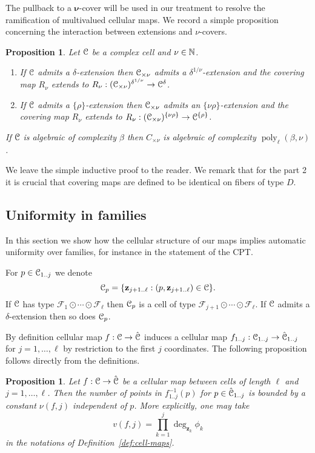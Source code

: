 \documentclass[reqno]{amsart}
\newtheorem{Prop}[Cor]{Proposition}{\bfseries}{\itshape}
\renewcommand\~[1]{\widetilde{#1}}
\def\poly{\operatorname{poly}} \def\J{\operatorname{J}}
\def\cF{{\mathcal F}} \def\cL{{\mathcal L}} \def\cR{{\mathcal R}}
\def\vz{{\mathbf z}}
\def\vnu{{\boldsymbol\nu}}
\def\he#1{{\{#1\}}}
\def\hrho{{\he\rho}}
\begin{document}
The pullback to a $\vnu$-cover will be used in our treatment to
resolve the ramification of multivalued cellular maps. We record a
simple proposition concerning the interaction between extensions and
$\nu$-covers. 

\begin{Prop}\label{prop:ext-v-cover}
  Let ${\mathcal C}$ be a complex cell and $\nu\in{\mathbb N}$.
  \begin{enumerate}
  \item If ${\mathcal C}$ admits a $\delta$-extension then ${\mathcal C}_{\times\nu}$
    admits a $\delta^{1/\nu}$-extension and the covering map $R_\nu$
    extends to
    $R_\nu:({\mathcal C}_{\times\nu})^{\delta^{1/\nu}}\to{\mathcal C}^\delta$.
  \item If ${\mathcal C}$ admits a $\hrho$-extension then ${\mathcal C}_{\times\nu}$
    admits an $\he{\nu\rho}$-extension and the covering map $R_\nu$
    extends to $R_\nu:(\cC_{\times\nu})^{\he{\nu\rho}}\to\cC^\hrho$.
  \end{enumerate}
  If ${\mathcal C}$ is algebraic of complexity $\beta$ then $C_{\times\nu}$ is
  algebraic of complexity $\poly_\ell(\beta,\nu)$.
\end{Prop}

We leave the simple inductive proof to the reader. We remark that for
the part 2 it is crucial that covering maps are defined to be
identical on fibers of type $D$.

\subsection{Uniformity in families}
\label{sec:uniform-families}

In this section we show how the cellular structure of our maps implies
automatic uniformity over families, for instance in the statement of
the CPT. 

For $p\in{\mathcal C}_{1..j}$ we denote
\begin{equation}
  \cC_p = \{\vz_{j+1..\ell} : (p,\vz_{j+1..\ell})\in\cC\}.
\end{equation}
If ${\mathcal C}$ has type $\cF_1\odot\cdots\odot\cF_\ell$ then ${\mathcal C}_p$ is a
cell of type $\cF_{j+1}\odot\cdots\odot\cF_\ell$. If ${\mathcal C}$ admits a
$\delta$-extension then so does ${\mathcal C}_p$.

By definition cellular map $f:{\mathcal C}\to\hat{{\mathcal C}}$ induces a cellular map
$f_{1..j}:{\mathcal C}_{1..j}\to\hat{{\mathcal C}}_{1..j}$ for $j=1,\ldots,\ell$ by
restriction to the first $j$ coordinates. The following proposition
follows directly from the definitions.

\begin{Prop}\label{prop:map-fiber-bound}
  Let $f:{\mathcal C}\to\hat{{\mathcal C}}$ be a cellular map between cells of length
  $\ell$ and $j=1,\ldots,\ell$. Then the number of points in
  $f_{1..j}^{-1}(p)$ for $p\in\hat{{\mathcal C}}_{1..j}$ is bounded by a constant
  $\nu(f,j)$ independent of $p$. More explicitly, one may take
  \begin{equation}
    v(f,j) = \prod_{k=1}^j \deg_{\vz_k}\phi_k
  \end{equation}
  in the notations of Definition~\ref{def:cell-maps}.
\end{Prop}
\end{document}
